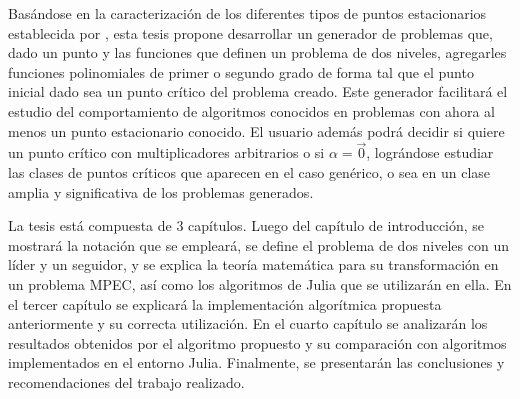 Basándose en la caracterización de los diferentes tipos de puntos estacionarios establecida por \cite{Flegel2003AFJ}, esta tesis propone desarrollar un generador de problemas que, dado un punto y las funciones  que definen un problema de dos niveles, agregarles funciones polinomiales de primer o segundo grado de forma tal que el punto inicial dado sea un punto crítico del problema creado. 
Este generador facilitará el estudio del comportamiento de algoritmos conocidos en problemas con ahora al menos un punto estacionario conocido.
El usuario además podrá decidir si quiere un punto crítico con multiplicadores arbitrarios o si $\alpha = \vec{0}$, lográndose estudiar las clases de puntos críticos que aparecen en el caso genérico, o sea en un clase amplia y significativa de los problemas generados.



La tesis está compuesta de 3 capítulos. Luego del capítulo de introducción,  
se mostrará la notación que se empleará, se define el problema de dos niveles con un líder y un seguidor, y se explica la teoría matemática para su transformación en un problema MPEC, así como los algoritmos de Julia que se utilizarán en ella.
En el tercer capítulo se explicará la implementación algorítmica propuesta anteriormente y su correcta utilización. 
En el cuarto capítulo se analizarán los resultados obtenidos por el algoritmo propuesto y su comparación con algoritmos implementados en el entorno Julia.
Finalmente, se presentarán las conclusiones y recomendaciones del trabajo realizado.